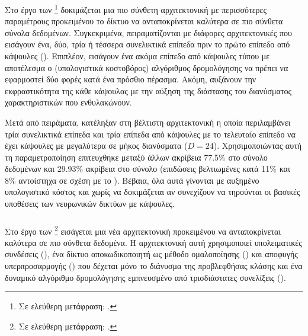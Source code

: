 \subsubsection{}

Στο έργο των  \footnote{Σε ελεύθερη μετάφραση: .} \cite{liu2019ddrm} δοκιμάζεται μια πιο σύνθετη αρχιτεκτονική με περισσότερες παραμέτρους προκειμένου το δίκτυο να ανταποκρίνεται καλύτερα σε πιο σύνθετα σύνολα δεδομένων. Συγκεκριμένα, πειραματίζονται με διάφορες αρχιτεκτονικές που εισάγουν ένα, δύο, τρία ή τέσσερα συνελικτικά επίπεδα πριν το πρώτο επίπεδο από κάψουλες (). Επιπλέον, εισάγουν ένα ακόμα επίπεδο από κάψουλες τύπου  με αποτέλεσμα ο (υπολογιστικά κοστοβόρος) αλγόριθμος δρομολόγησης να πρέπει να εφαρμοστεί δύο φορές κατά ένα πρόσθιο πέρασμα. Ακόμη, αυξάνουν την εκφραστικότητα της κάθε κάψουλας με την αύξηση της διάστασης του διανύσματος χαρακτηριστικών που ενθυλακώνουν.\par

Μετά από πειράματα, κατέληξαν στη βέλτιστη αρχιτεκτονική η οποία περιλαμβάνει τρία συνελικτικά επίπεδα και τρία επίπεδα από κάψουλες με το τελευταίο επίπεδο να έχει κάψουλες με μεγαλύτερα σε μήκος διανύσματα ($D=24$). Χρησιμοποιώντας αυτή τη παραμετροποίηση επιτευχθηκε μεταξύ άλλων ακρίβεια 77.5\% στο σύνολο δεδομένων  και 29.93\% ακρίβεια στο σύνολο  (επιδώσεις βελτιωμένες κατά 11\% και 8\% αντοίστηχα σε σχέση με το \cite{sabour2017dynamic}). Βέβαια, όλα αυτά γίνονται με αυξημένο υπολογιστικό κόστος και χωρίς να δοκιμάζεται αν συνεχίζουν να τηρούνται οι βασικές υποθέσεις των νευρωνικών δικτύων με κάψουλες.

\subsubsection{}

Στο έργο των  \footnote{Σε ελεύθερη μετάφραση: .} \cite{rajasegaran2019deepcaps} εισάγεται μια νέα αρχιτεκτονική προκειμένου να ανταποκρίνεται καλύτερα σε πιο σύνθετα δεδομένα. Η αρχιτεκτονική αυτή χρησιμοποιεί υπολειματικές συνδέσεις (), ένα δίκτυο αποκωδικοποιητή ως μέθοδο ομαλοποίησης () και αποφυγής υπερπροσαρμογής () που δέχεται μόνο το διάνυσμα της προβλεφθήσας κλάσης και ένα δυναμικό αλγόριθμο δρομολόγησης εμπνευσμένο από τρισδιάστατες συνελίξεις (). \par

